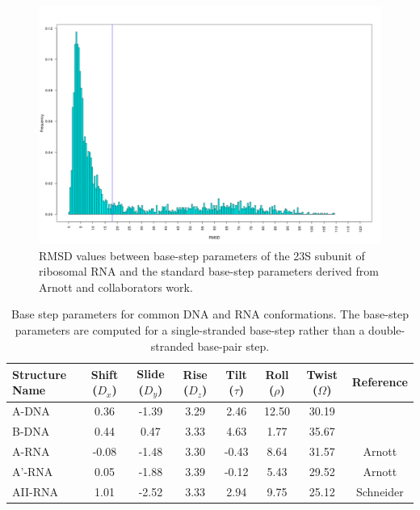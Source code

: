 \begin{figure}
 \centering
\includegraphics[angle=0, scale=0.4]{Chapter2/dormsd.png}
\caption{RMSD values between base-step parameters of the 23S subunit of
  ribosomal RNA and the standard base-step parameters derived from
  Arnott and collaborators \cite{arnott1973} work.}
 \label{fig:dormsd}
\end{figure}

\begin{table}[htbp]
\begin{center}
{\small
\begin{tabular}{p{2cm}|c|c|c|c|c|c|c}
\hline
\textbf{Structure Name} & Shift ($D_x$) & Slide ($D_y$) & Rise ($D_z$) & Tilt
($\tau$) & Roll ($\rho$) & Twist ($\Omega$) & \textbf{Reference} \\ \hline
A-DNA & 0.36 & -1.39 & 3.29 & 2.46 & 12.50 & 30.19 & \\ \hline
B-DNA & 0.44 & 0.47 & 3.33 & 4.63 & 1.77 & 35.67 & \\ \hline
A-RNA & -0.08 & -1.48 & 3.30 & -0.43 & 8.64 & 31.57 & Arnott \\ \hline
A'-RNA & 0.05 & -1.88 & 3.39 & -0.12 & 5.43 & 29.52 & Arnott \\ \hline
AII-RNA & 1.01 & -2.52 & 3.33 & 2.94 & 9.75 & 25.12 & Schneider \\ \hline
\end{tabular}
}
\caption{Base step parameters for common DNA and RNA
  conformations. The base-step parameters are computed for
  a single-stranded base-step rather than a double-stranded base-pair step.}
\end{center}
\label{tab:conformations}
\end{table}

